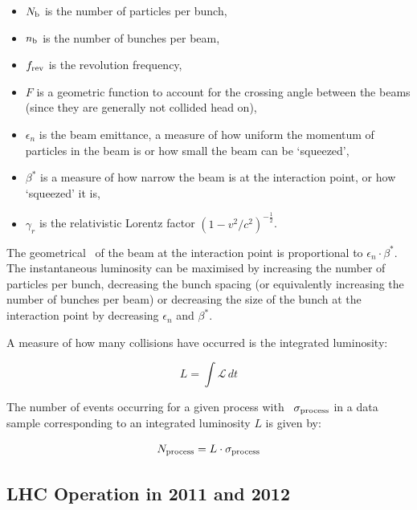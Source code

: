 \begin{itemize}
    \item $N_{\rm{b}}$ is the number of particles per bunch,
    \item $n_{\rm{b}}$ is the number of bunches per beam, 
    \item $f_{\rm{rev}}$ is the revolution frequency, 
    \item $F$ is a geometric function to account for the crossing angle between the beams (since
they are generally not collided head on), 
    \item $\epsilon_{n}$ is the beam emittance,
a measure of how uniform the momentum of particles in the beam is or how small
the beam can be `squeezed',
    \item $\beta^{*}$ is a measure of how narrow the beam is at the interaction
    point, or how `squeezed' it is,
    \item $\gamma_{r}$ is the relativistic Lorentz factor $(1 -
    v^2/c^2)^{-\frac{1}{2}}$.
\end{itemize}
    
The geometrical \cx\ of the beam at
the interaction point is proportional to ${\epsilon_{n} \cdot \beta^{*}}$.
The instantaneous luminosity can be maximised by increasing the
number of particles per bunch, decreasing the bunch spacing (or equivalently
increasing the number of bunches per beam) or decreasing the size of the bunch
at the interaction point by decreasing $\epsilon_{n}$ and $\beta^{*}$.

A measure of how many collisions have occurred is the integrated luminosity:

\begin{equation}
L = \int \mathcal{L} \, dt
\end{equation}

The number of events occurring for a given process with \cx\
$\sigma_{\rm{process}}$ in a data sample corresponding to an integrated
luminosity $L$ is given by:

\begin{equation}
N_{\rm{process}} = L \cdot \sigma_{\rm{process}}
\end{equation}

\subsection{LHC Operation in 2011 and 2012}
\label{sec-lhc-operation}

